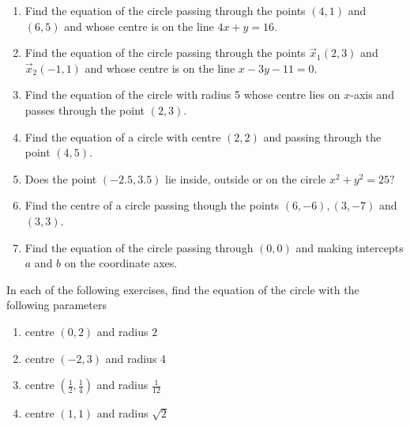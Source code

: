 \begin{enumerate}[label=\thesubsection.\arabic*,ref=\thesubsection.\theenumi]
  \item Find the equation of the circle passing through the points $(4,1)$ and $(6,5)$ and whose centre is on the line $ 4x+y=16. $
\label{chapters/11/11/1/10}
\\
\solution

  \item Find the equation of the circle passing through the points $\vec{x}_1(2,3)$ and $\vec{x}_2(-1,1)$ and whose centre is on the line $x-3y-11=0$.
\label{chapters/11/11/1/11}
\\
\solution 

  \item Find the equation of the circle with radius 5 whose centre lies on $x$-axis and passes through the point $(2,3)$.
\label{chapters/11/11/1/12}
\\
\solution 

  \item Find the equation of a circle with centre $(2,2)$ and passing through the point $(4,5)$.
\label{chapters/11/11/1/14}
\\
\solution

  \item Does the point $(-2.5,3.5)$ lie inside, outside or on the circle $x^{2}+y^{2}=25?$
\\
\solution

\item Find the centre of a circle passing though the points $(6,-6), (3,-7)$ and $(3,3)$. \\ 
\label{chapters/10/7/4/3}
\solution 

  \item Find the equation of the circle passing through $(0,0)$ and making intercepts $a$ and $b$ on the coordinate axes.
\end{enumerate}
In each of the following exercises, find the equation of the circle with the following parameters
\begin{enumerate}[label=\thesubsection.\arabic*,ref=\thesubsection.\theenumi,resume*]
 \item centre $(0,2)$ and radius $2$
	 \\
		\solution
\label{chapters/11/11/1/1}

%
  \item centre $(-2,3)$ and radius 4
	 \\
		\solution
\label{chapters/11/11/1/2}


  \item centre $\left(\frac{1}{2}, \frac{1}{4}\right)$ and radius $\frac{1}{12}$
\label{chapters/11/11/1/3}
	 \\
		\solution

  \item centre $(1,1)$ and radius $\sqrt{2}$
	 \\
		\solution

\end{enumerate}
